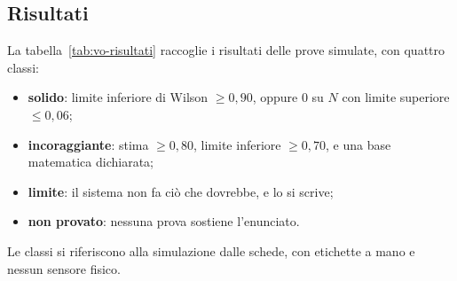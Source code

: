 \subsection{Risultati}\label{sec:vo-risultati}

La tabella~\ref{tab:vo-risultati} raccoglie i risultati delle prove simulate, con quattro classi:
\begin{itemize}
\item \textbf{solido}: limite inferiore di Wilson $\ge0{,}90$, oppure 0 su $N$ con limite superiore $\le0{,}06$;
\item \textbf{incoraggiante}: stima $\ge0{,}80$, limite inferiore $\ge0{,}70$, e una base matematica dichiarata;
\item \textbf{limite}: il sistema non fa ciò che dovrebbe, e lo si scrive;
\item \textbf{non provato}: nessuna prova sostiene l'enunciato.
\end{itemize}
Le classi si riferiscono alla simulazione dalle schede, con etichette a mano e nessun sensore fisico.

